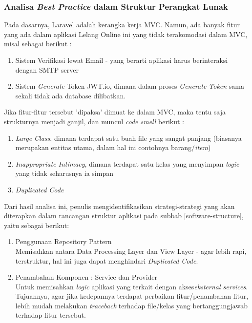 	\subsubsection{Analisa \textit{Best Practice} dalam Struktur Perangkat Lunak}
		\label{alasan-best-practice}
		Pada dasarnya, Laravel adalah kerangka kerja MVC. Namun, ada banyak fitur yang ada dalam aplikasi Lelang Online ini yang tidak terakomodasi dalam MVC, misal sebagai berikut :
		\begin{enumerate}
			\item Sistem Verifikasi lewat Email - yang berarti aplikasi harus berinteraksi dengan SMTP server
			\item Sistem \textit{Generate} Token JWT.io, dimana dalam proses \textit{Generate Token} sama sekali tidak ada database dilibatkan.
		\end{enumerate}
		\indent Jika fitur-fitur tersebut 'dipaksa' dimuat ke dalam MVC, maka tentu saja strukturnya menjadi ganjil, dan muncul \textit{code smell} berikut :
		\begin{enumerate}
			\item \textit{Large Class}, dimana terdapat satu buah file yang sangat panjang (biasanya merupakan entitas utama, dalam hal ini contohnya barang/\textit{item})
			\item \textit{Inappropriate Intimacy}, dimana terdapat satu kelas yang menyimpan \textit{logic} yang tidak seharusnya ia simpan
			\item \textit{Duplicated Code}
		\end{enumerate}		
		\indent Dari hasil analisa ini, penulis mengidentifikasikan strategi-strategi yang akan diterapkan dalam rancangan struktur aplikasi pada subbab \ref{software-structure}, yaitu sebagai berikut:
			\begin{enumerate}
				\item Penggunaan Repository Pattern
				\\ Memisahkan antara Data Processing Layer dan View Layer - agar lebih rapi, terstruktur, hal ini juga dapat menghindari \textit{Duplicated Code}.
				\item Penambahan Komponen : Service dan Provider \\
				Untuk memisahkan \textit{logic} aplikasi yang terkait dengan akses\textit{eksternal services}. Tujuannya, agar jika kedepannya terdapat perbaikan fitur/penambahan fitur, lebih mudah melakukan \textit{traceback} terhadap file/kelas yang bertanggungjawab terhadap fitur tersebut.
			\end{enumerate}
	
